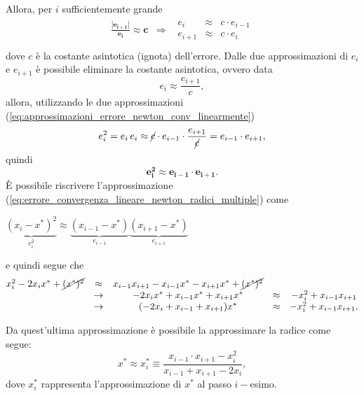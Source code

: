 Allora, per $i$ sufficientemente grande
\begin{equation}\label{eq:approssimazioni_errore_newton_conv_linearmente}
	\begin{matrix}
		\boldsymbol{\frac{|e_{i+1}|}{e_i}\approx c}&\Rightarrow&
		\begin{matrix}
			e_i &\approx& c\cdot e_{i-1}\\
			e_{i+1}&\approx& c\cdot e_i
		\end{matrix}\\
	\end{matrix}
\end{equation}
dove $c$ è la costante asintotica (ignota) dell'errore. Dalle due approssimazioni di $e_i$ e $e_{i+1}$ è possibile eliminare la costante asintotica, ovvero data
\begin{equation*}
	e_i \approx \frac{e_{i+1}}{c},
\end{equation*}
allora, utilizzando le due approssimazioni (\ref{eq:approssimazioni_errore_newton_conv_linearmente})
\begin{equation*}
	e_i^2=e_i\,e_i \approx\cancel{c}\cdot e_{i-1}\cdot \frac{e_{i+1}}{\cancel{c}} = e_{i-1}\cdot e_{i+1},
\end{equation*}
quindi
\begin{equation}\label{eq:errore_convergenza_lineare_newton_radici_multiple}
	\boldsymbol{e_i^2 \approx e_{i-1}\cdot e_{i+1}}.
\end{equation}
È possibile riscrivere l'approssimazione (\ref{eq:errore_convergenza_lineare_newton_radici_multiple}) come
\begin{center}
	$\underbrace{(x_i-x^*)^2}_{\text{$e_i^2$}}\approx\underbrace{(x_{i-1}-x^*)}_{\text{$e_{i-1}$}}\underbrace{(x_{i+1}-x^*)}_{\text{$e_{i+1}$}}$ 
\end{center}
e quindi segue che
\begin{equation*}
	\begin{matrix}
		x_i^2-2x_i x^*+\cancel{(x^*)^2}&\approx& x_{i-1} x_{i+1}-x_{i-1} x^* - x_{i+1} x^*+\cancel{(x^*)^2}\\
		&\rightarrow&-2x_i x^*+x_{i-1} x^*+x_{i+1}x^*&\approx&-x_i^2+x_{i-1} x_{i+1}\\
		&\rightarrow&(-2x_i+x_{i-1}+x_{i+1})x^* &\approx& -x_i^2+x_{i-1} x_{i+1}.
	\end{matrix}
\end{equation*}

Da quest'ultima approssimazione è possibile la approssimare la radice come segue:
\begin{equation}\label{eq:approssimazione_aitken}
	x^*\approx x_i^*\equiv\frac{x_{i-1}\cdot x_{i+1} - x_i^2}{x_{i-1} + x_{i+1} - 2x_i},
\end{equation}
dove $x_i^*$ rappresenta l'approssimazione di $x^*$ al passo $i-$esimo.

